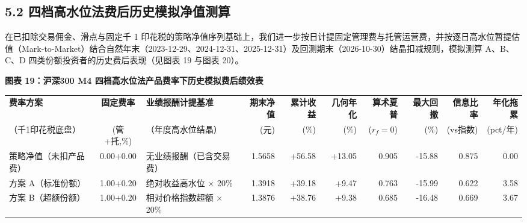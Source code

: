 \documentclass[12pt,a4paper]{article}
\let\origsubsection\subsection
\renewcommand{\subsection}[1]{\needspace{4\baselineskip}\origsubsection{#1}}
\newcommand{\exhibitcap}[1]{{\sffamily\bfseries\fontsize{9.6pt}{12.5pt}\selectfont\textcolor{Primary}{#1}}\\[2pt]}
\begin{document}
\subsection{5.2 四档高水位法费后历史模拟净值测算}

在已扣除交易佣金、滑点与固定千 1 印花税的策略净值序列基础上，我们进一步按日计提固定管理费与托管运营费，并按逐日高水位暂提估值（Mark-to-Market）结合自然年末（2023-12-29、2024-12-31、2025-12-31）及回测期末（2026-10-30）结晶扣减规则，模拟测算 A、B、C、D 四类份额投资者的历史费后表现（见图表 19 与图表 20）。

\vspace{4pt}
\noindent\begin{minipage}{\textwidth}
\setlength{\parindent}{0pt}\setlength{\tabcolsep}{2.4pt}
\exhibitcap{图表 19：沪深300 M4 四档高水位法产品费率下历史模拟费后绩效表}
\fontsize{7.25pt}{9.9pt}\selectfont
\begin{tabularx}{\textwidth}{@{}l c >{\raggedright\arraybackslash}X r r r r r r r@{}}
  \arrayrulecolor{Primary}\toprule[1.0pt]
  \rowcolor{TblHdr}
  \textbf{\sffamily 费率方案} & \textbf{\sffamily 固定费率} & \textbf{\sffamily 业绩报酬计提基准} & \textbf{\sffamily 期末净值} & \textbf{\sffamily 累计收益} & \textbf{\sffamily 几何年化} & \textbf{\sffamily 算术夏普} & \textbf{\sffamily 最大回撤} & \textbf{\sffamily 信息比率} & \textbf{\sffamily 年化拖累} \\
  \rowcolor{TblHdr}
  {\fontsize{6.2}{7.6}\selectfont\textcolor{GrayNote}{（千1印花税底盘）}} &
  {\fontsize{6.2}{7.6}\selectfont\textcolor{GrayNote}{(管+托,\%)}} &
  {\fontsize{6.2}{7.6}\selectfont\textcolor{GrayNote}{（年度高水位结晶）}} &
  {\fontsize{6.2}{7.6}\selectfont\textcolor{GrayNote}{(元)}} &
  {\fontsize{6.2}{7.6}\selectfont\textcolor{GrayNote}{(\%)}} &
  {\fontsize{6.2}{7.6}\selectfont\textcolor{GrayNote}{(\%)}} &
  {\fontsize{6.2}{7.6}\selectfont\textcolor{GrayNote}{($r_f=0$)}} &
  {\fontsize{6.2}{7.6}\selectfont\textcolor{GrayNote}{(\%)}} &
  {\fontsize{6.2}{7.6}\selectfont\textcolor{GrayNote}{(vs指数)}} &
  {\fontsize{6.2}{7.6}\selectfont\textcolor{GrayNote}{(pct/年)}} \\
  \midrule[0.5pt]
    策略净值（未扣产品费） & 0.00+0.00 & 无业绩报酬（已含交易费） & 1.5658 & +56.58 & +13.05 & 0.905 & -15.88 & 0.875 & 0.00 \\
    方案 A（标准份额） & 1.00+0.20 & 绝对收益高水位 × 20\% & 1.3918 & +39.18 & +9.47 & 0.763 & -15.99 & 0.622 & 3.58 \\
    方案 B（超额份额） & 1.00+0.20 & 相对价格指数超额 × 20\% & 1.3876 & +38.76 & +9.38 & 0.685 & -16.48 & 0.669 & 3.67 \\

\end{tabularx}
\end{minipage}
\end{document}
